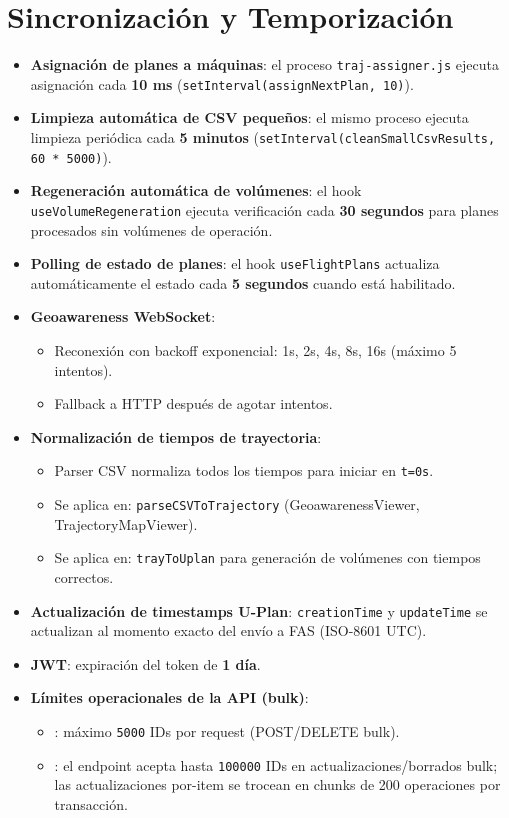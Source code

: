 \documentclass[12pt,a4paper]{article}
\newcommand{\icdendpoint}[1]{\begingroup\small\path{#1}\endgroup}
\begin{document}
\section{Sincronización y Temporización}
\begin{itemize}
    \item \textbf{Asignación de planes a máquinas}: el proceso \texttt{traj-assigner.js} ejecuta asignación cada \textbf{10 ms} (\texttt{setInterval(assignNextPlan, 10)}).
    \item \textbf{Limpieza automática de CSV pequeños}: el mismo proceso ejecuta limpieza periódica cada \textbf{5 minutos} (\texttt{setInterval(cleanSmallCsvResults, 60 * 5000)}).
    \item \textbf{Regeneración automática de volúmenes}: el hook \texttt{useVolumeRegeneration} ejecuta verificación cada \textbf{30 segundos} para planes procesados sin volúmenes de operación.
    \item \textbf{Polling de estado de planes}: el hook \texttt{useFlightPlans} actualiza automáticamente el estado cada \textbf{5 segundos} cuando está habilitado.
    \item \textbf{Geoawareness WebSocket}:
    \begin{itemize}
        \item Reconexión con backoff exponencial: 1s, 2s, 4s, 8s, 16s (máximo 5 intentos).
        \item Fallback a HTTP después de agotar intentos.
    \end{itemize}
    \item \textbf{Normalización de tiempos de trayectoria}: 
    \begin{itemize}
        \item Parser CSV normaliza todos los tiempos para iniciar en \texttt{t=0s}.
        \item Se aplica en: \texttt{parseCSVToTrajectory} (GeoawarenessViewer, TrajectoryMapViewer).
        \item Se aplica en: \texttt{trayToUplan} para generación de volúmenes con tiempos correctos.
    \end{itemize}
    \item \textbf{Actualización de timestamps U-Plan}: \texttt{creationTime} y \texttt{updateTime} se actualizan al momento exacto del envío a FAS (ISO-8601 UTC).
    \item \textbf{JWT}: expiración del token de \textbf{1 día}.
    \item \textbf{Límites operacionales de la API (bulk)}:
    \begin{itemize}
        \item \icdendpoint{/api/csvResult}: máximo \texttt{5000} IDs por request (POST/DELETE bulk).
        \item \icdendpoint{/api/flightPlans}: el endpoint acepta hasta \texttt{100000} IDs en actualizaciones/borrados bulk; las actualizaciones por-item se trocean en chunks de 200 operaciones por transacción.
    \end{itemize}
\end{itemize}
\end{document}
